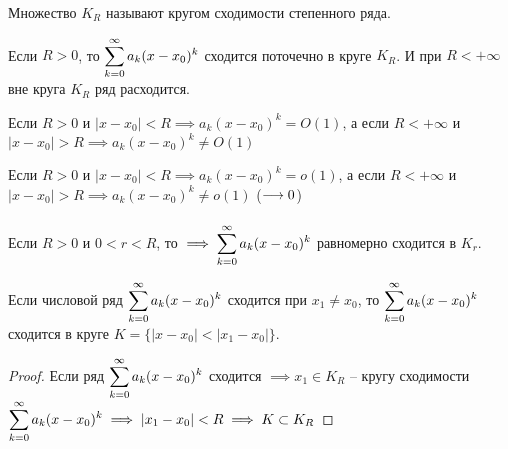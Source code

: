 \begin{definition}
    Множество $K_R$ называют кругом сходимости степенного ряда.
\end{definition}

\begin{corollary}
    Если $R > 0$, то $\displaystyle\sum_{k=0}^\infty a_k (x - x_0)^k$ сходится поточечно в круге $K_R$.
    И при $R < +\infty$ вне круга $K_R$ ряд расходится.
\end{corollary}

\begin{corollary}
    Если $R > 0$ и $|x - x_0| < R \implies a_k (x - x_0)^k = O(1)$,
    а если $R < +\infty$ и $|x - x_0| > R \implies a_k (x - x_0)^k \neq O(1)$
\end{corollary}

\begin{corollary}
    Если $R > 0$ и $|x - x_0| < R \implies a_k (x - x_0)^k = o(1)$, а
    если $R < +\infty$ и $|x - x_0| > R \implies a_k (x - x_0)^k \neq o(1)$
    ($\underset{}{\longrightarrow} 0$)
\end{corollary}

\begin{corollary}
    Если $R > 0$ и $0 < r < R$, то $\implies \displaystyle\sum_{k=0}^\infty a_k (x - x_0)^k$
    равномерно сходится в $K_r$.
\end{corollary}

\begin{theorem}[Абеля]
    Если числовой ряд $\displaystyle\sum_{k=0}^\infty a_k (x - x_0)^k$ сходится при $x_1 \neq x_0$,
    то $\displaystyle\sum_{k=0}^\infty a_k (x - x_0)^k$ сходится в круге 
    $K = \{ |x - x_0| < |x_1 - x_0| \}$.
\end{theorem}
\begin{proof}
    Если ряд $\displaystyle\sum_{k=0}^\infty a_k (x - x_0)^k$ сходится $\implies x_1 \in K_R$ --
    кругу сходимости 
    $\displaystyle\sum_{k=0}^\infty a_k (x - x_0)^k \implies |x_1 - x_0| < R \implies K \subset K_R$
\end{proof}

